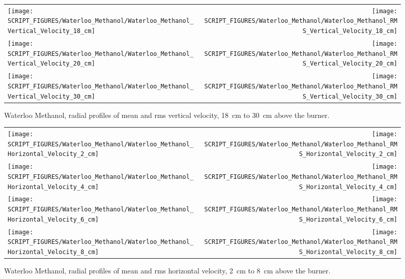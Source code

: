 \begin{figure}[p]
\begin{tabular*}{\textwidth}{l@{\extracolsep{\fill}}r}
\texttt{[image: SCRIPT\_FIGURES/Waterloo\_Methanol/Waterloo\_Methanol\_Vertical\_Velocity\_18\_cm]} &
\texttt{[image: SCRIPT\_FIGURES/Waterloo\_Methanol/Waterloo\_Methanol\_RMS\_Vertical\_Velocity\_18\_cm]} \\
\texttt{[image: SCRIPT\_FIGURES/Waterloo\_Methanol/Waterloo\_Methanol\_Vertical\_Velocity\_20\_cm]} &
\texttt{[image: SCRIPT\_FIGURES/Waterloo\_Methanol/Waterloo\_Methanol\_RMS\_Vertical\_Velocity\_20\_cm]} \\
\texttt{[image: SCRIPT\_FIGURES/Waterloo\_Methanol/Waterloo\_Methanol\_Vertical\_Velocity\_30\_cm]} &
\texttt{[image: SCRIPT\_FIGURES/Waterloo\_Methanol/Waterloo\_Methanol\_RMS\_Vertical\_Velocity\_30\_cm]}
\end{tabular*}
\caption[Waterloo Methanol, radial mean and rms vert.~vel., 18~cm to 30~cm above burner]
{Waterloo Methanol, radial profiles of mean and rms vertical velocity, 18~cm to 30~cm above the burner.}
\label{Water_Methanol_Vert_Vel_3}
\end{figure}


\begin{figure}[p]
\begin{tabular*}{\textwidth}{l@{\extracolsep{\fill}}r}
\texttt{[image: SCRIPT\_FIGURES/Waterloo\_Methanol/Waterloo\_Methanol\_Horizontal\_Velocity\_2\_cm]} &
\texttt{[image: SCRIPT\_FIGURES/Waterloo\_Methanol/Waterloo\_Methanol\_RMS\_Horizontal\_Velocity\_2\_cm]} \\
\texttt{[image: SCRIPT\_FIGURES/Waterloo\_Methanol/Waterloo\_Methanol\_Horizontal\_Velocity\_4\_cm]} &
\texttt{[image: SCRIPT\_FIGURES/Waterloo\_Methanol/Waterloo\_Methanol\_RMS\_Horizontal\_Velocity\_4\_cm]} \\
\texttt{[image: SCRIPT\_FIGURES/Waterloo\_Methanol/Waterloo\_Methanol\_Horizontal\_Velocity\_6\_cm]} &
\texttt{[image: SCRIPT\_FIGURES/Waterloo\_Methanol/Waterloo\_Methanol\_RMS\_Horizontal\_Velocity\_6\_cm]} \\
\texttt{[image: SCRIPT\_FIGURES/Waterloo\_Methanol/Waterloo\_Methanol\_Horizontal\_Velocity\_8\_cm]} &
\texttt{[image: SCRIPT\_FIGURES/Waterloo\_Methanol/Waterloo\_Methanol\_RMS\_Horizontal\_Velocity\_8\_cm]}
\end{tabular*}
\caption[Waterloo Methanol, radial mean and rms horz.~vel., 2~cm to 8~cm above burner]
{Waterloo Methanol, radial profiles of mean and rms horizontal velocity, 2~cm to 8~cm above the burner.}
\label{Water_Methanol_Hori_Vel_1}
\end{figure}

